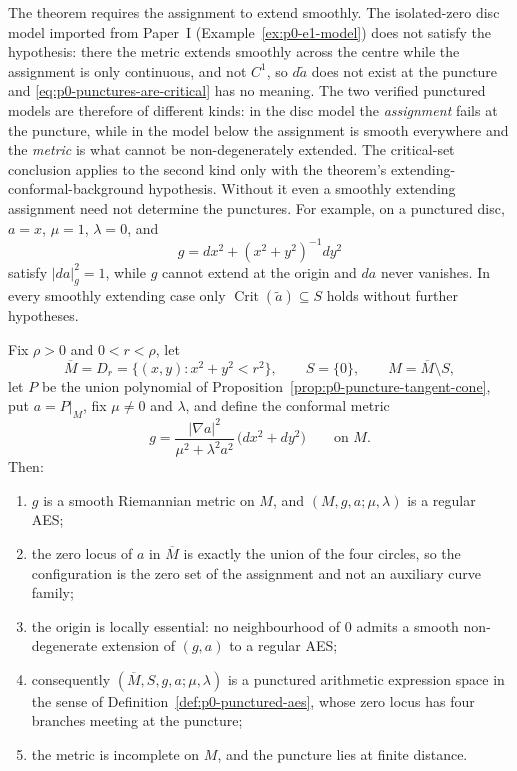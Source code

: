 \begin{remark}
\label{rem:p0-puncture-hypothesis}
The theorem requires the assignment to extend smoothly.  The isolated-zero disc
model imported from Paper~I (Example~\ref{ex:p0-e1-model}) does not satisfy the
hypothesis: there the metric extends smoothly across the centre while the
assignment is only continuous, and not $C^1$, so $d\widetilde a$ does not exist
at the puncture and \eqref{eq:p0-punctures-are-critical} has no meaning.  The two
verified punctured models are therefore of different kinds: in the disc model the
\emph{assignment} fails at the puncture, while in the model below the assignment is
smooth everywhere and the \emph{metric} is what cannot be non-degenerately extended.
The critical-set conclusion applies to the second kind only with the theorem's
extending-conformal-background hypothesis.  Without it even a smoothly
extending assignment need not determine the punctures.  For example, on a
punctured disc, $a=x$, $\mu=1$, $\lambda=0$, and
\[
  g=dx^2+(x^2+y^2)^{-1}dy^2
\]
satisfy $|da|_g^2=1$, while $g$ cannot extend at the origin and $da$ never
vanishes.  In every smoothly extending case only
$\operatorname{Crit}(\widetilde a)\subseteq S$ holds without further hypotheses.
\end{remark}

\begin{theorem}
\label{thm:p0-four-circle-model}
Fix $\rho>0$ and $0<r<\rho$, let
\[
  \overline M=D_r=\{(x,y):x^2+y^2<r^2\},
  \qquad
  S=\{0\},
  \qquad
  M=\overline M\setminus S ,
\]
let $P$ be the union polynomial of
Proposition~\ref{prop:p0-puncture-tangent-cone}, put $a=P|_M$, fix
$\mu\ne0$ and $\lambda$, and define the conformal metric
\begin{equation}\label{eq:p0-four-circle-metric}
  g=\frac{|\nabla a|^2}{\mu^2+\lambda^2a^2}\,
    \bigl(dx^2+dy^2\bigr)
  \qquad\text{on }M .
\end{equation}
Then:
\begin{enumerate}
  \item $g$ is a smooth Riemannian metric on $M$, and $(M,g,a;\mu,\lambda)$ is a
  regular AES;
  \item the zero locus of $a$ in $\overline M$ is exactly the union of the four
  circles, so the configuration is the zero set of the assignment and not an
  auxiliary curve family;
  \item the origin is locally essential: no neighbourhood of $0$ admits a smooth
  non-degenerate extension of $(g,a)$ to a regular AES;
  \item consequently $(\overline M,S,g,a;\mu,\lambda)$ is a punctured arithmetic
  expression space in the sense of Definition~\ref{def:p0-punctured-aes}, whose
  zero locus has four branches meeting at the puncture;
  \item the metric is incomplete on $M$, and the puncture lies at finite distance.
\end{enumerate}
\end{theorem}

